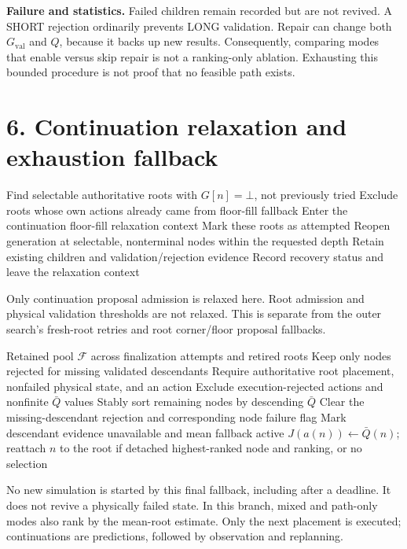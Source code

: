 \documentclass[11pt]{article}
\newcommand{\Gval}{G_{\mathrm{val}}}
\newcommand{\none}{\bot}
\newcommand{\MeanRoot}{\bar Q}
\begin{document}
\textbf{Failure and statistics.} Failed children remain recorded but are not
revived. A SHORT rejection ordinarily prevents LONG validation. Repair can
change both $\Gval$ and $Q$, because it backs up new results. Consequently,
comparing modes that enable versus skip repair is not a ranking-only ablation.
Exhausting this bounded procedure is not proof that no feasible path exists.

\newpage
\section*{6. Continuation relaxation and exhaustion fallback}
\begin{algorithm}[H]
\caption{RelaxFloorContinuations: optional second repair pass}
\small
\begin{algorithmic}[1]
    \State \Return
  \EndIf
  \State Find selectable authoritative roots with $G[n]=\none$, not previously tried
  \State Exclude roots whose own actions already came from floor-fill fallback
   \State \Return \EndIf
  \State Enter the continuation floor-fill relaxation context
  \State Mark these roots as attempted
  \State Reopen generation at selectable, nonterminal nodes within the requested depth
  \State Retain existing children and validation/rejection evidence
  \State {}
  \State Record recovery status and leave the relaxation context
\EndProcedure
\end{algorithmic}
\end{algorithm}
Only continuation proposal admission is relaxed here. Root admission and
physical validation thresholds are not relaxed. This is separate from the
outer search's fresh-root retries and root corner/floor proposal fallbacks.

\begin{algorithm}[H]
\caption{SelectDescendantFallback: last resort after outer retries/fallbacks}
\small
\begin{algorithmic}[1]
\Require Retained pool $\mathcal F$ across finalization attempts and retired roots
\State Keep only nodes rejected for missing validated descendants
\State Require authoritative root placement, nonfailed physical state, and an action
\State Exclude execution-rejected actions and nonfinite $\MeanRoot$ values
\State Stably sort remaining nodes by descending $\MeanRoot$
  \State Clear the missing-descendant rejection and corresponding node failure flag
  \State Mark descendant evidence unavailable and mean fallback active
  \State $J(a(n))\gets\MeanRoot(n)$; reattach $n$ to the root if detached
\EndFor
\State \Return highest-ranked node and ranking, or no selection
\end{algorithmic}
\end{algorithm}
No new simulation is started by this final fallback, including after a deadline.
It does not revive a physically failed state. In this branch, mixed and path-only
modes also rank by the mean-root estimate. Only the next placement is executed;
continuations are predictions, followed by observation and replanning.
\end{document}
